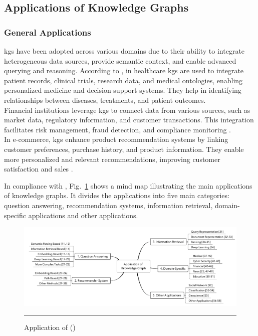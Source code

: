 \subsection*{Applications of Knowledge Graphs}

\subsubsection*{General Applications}
\glspl{kg} have been adopted across various domains due to their ability to integrate heterogeneous data sources, provide semantic context, and enable advanced querying and reasoning.
According to \textcite{Kapanipathi2020}, in healthcare \glspl{kg} are used to integrate patient records, clinical trials, research data, and medical ontologies, enabling personalized medicine and decision support systems. They help in identifying relationships between diseases, treatments, and patient outcomes.
\\Financial institutions leverage \glspl{kg} to connect data from various sources, such as market data, regulatory information, and customer transactions. This integration facilitates risk management, fraud detection, and compliance monitoring \cite{Tchechmedjiev2019}.
\\In e-commerce, \glspl{kg} enhance product recommendation systems by linking customer preferences, purchase history, and product information. They enable more personalized and relevant recommendations, improving customer satisfaction and sales \cite{Zhang2021}.

In compliance with \textcite{Zou2020}, Fig.~\ref{fig:kg-application-fields} shows a mind map illustrating the main applications of knowledge graphs. It divides the applications into five main categories: question answering, recommendation systems, information retrieval, domain-specific applications and other applications.

\begin{figure}[htbp]
    \centering
 \includegraphics[width=.92\textwidth]{figures/literature-review/kg-application-fields.png}
     \rule{35em}{0.5pt}
    \caption{Application of  (\textcite{Zou2020})} 
 \label{fig:kg-application-fields}
\end{figure}

